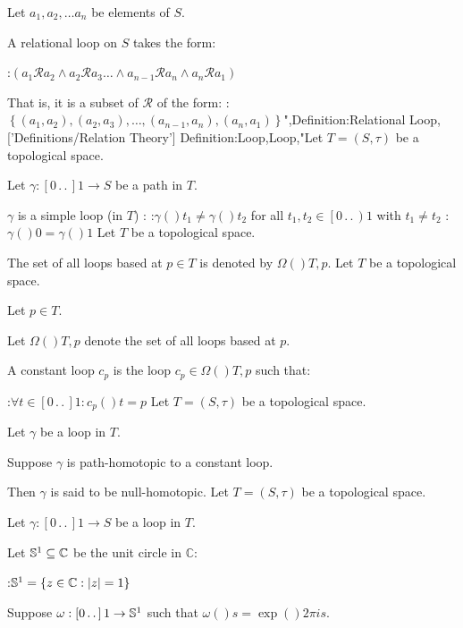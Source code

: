 Let $a_1, a_2, \ldots a_n$ be elements of $S$.


A relational loop on $S$ takes the form:

:$\left( a_1 \mathrel \mathcal R a_2 \land a_2 \mathrel \mathcal R a_3 \dots \land a_{n - 1} \mathrel \mathcal R a_n \land a_n \mathrel \mathcal R a_1 \right)$

That is, it is a subset of $\mathcal R$ of the form:
:$\left\lbrace \left( a_1, a_2 \right), \left( a_2, a_3 \right), \ldots, \left( a_{n - 1}, a_n \right), \left( a_n, a_1 \right)  \right\rbrace$",Definition:Relational Loop,['Definitions/Relation Theory']
Definition:Loop,Loop,"Let $T = \left( S, \tau \right)$ be a topological space.

Let $\gamma: \left[ 0 \,.\,.\,   \right]1 \to S$ be a path in $T$.


$\gamma$ is a simple loop (in $T$) :
:$\gamma \left(   \right){t_1} \ne \gamma \left(   \right){t_2}$ for all $t_1 ,t_2 \in \left[ 0 \,.\,.\,   \right)1$ with $t_1 \ne t_2$
:$\gamma \left(   \right)0 = \gamma \left(   \right)1$
Let $T$ be a topological space.


The set of all loops based at $p \in T$ is denoted by $\Omega \left(   \right){T, p}$.
Let $T$ be a topological space.

Let $p \in T$.

Let $\Omega \left(   \right){T, p}$ denote the set of all loops based at $p$.


A constant loop $c_p$ is the loop $c_p \in \Omega \left(   \right){T, p}$ such that:

:$\forall t \in \left[ 0 \,.\,.\,   \right]1 : c_p \left(   \right)t = p$
Let $T = \left( S, \tau \right)$ be a topological space.

Let $\gamma$ be a loop in $T$.

Suppose $\gamma$ is path-homotopic to a constant loop.


Then $\gamma$ is said to be null-homotopic.
Let $T = \left( S, \tau \right)$ be a topological space.

Let $\gamma: \left[ 0 \,.\,.\,   \right]1 \to S$ be a loop in $T$.

Let $\Bbb S^1 \subseteq \mathbb C$ be the unit circle in $\mathbb C$:

:$\Bbb S^1 = \left\lbrace z \in \mathbb C : \left\lvert z \right\rvert = 1 \right\rbrace$

Suppose $\omega : \left[ 0 \,.\,.\,   \right]1 \to \Bbb S^1$ such that $\omega \left(   \right)s = \exp \left(   \right){2 \pi i s}$.


